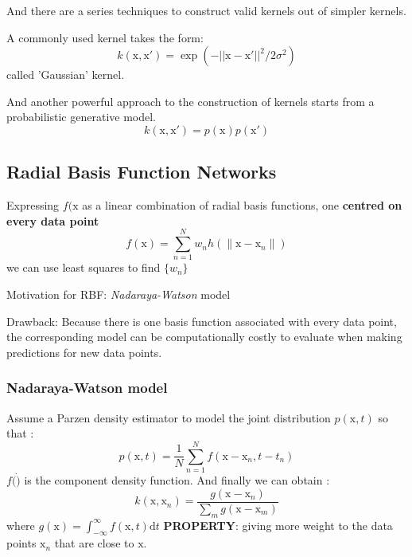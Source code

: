 \documentclass[a4paper]{book}
\begin{document}
And there are a series techniques to construct valid kernels out of simpler kernels.

A commonly used kernel takes the form:
$$k(\mathrm  x,\mathrm  x') = \exp(-||\mathrm  x-\mathrm  x'||^2/2\sigma^2)$$
called 'Gaussian' kernel.

And another powerful approach to the construction of kernels starts from a probabilistic generative model.  $$k(\mathrm  x,\mathrm x') = p(\mathrm  x)p(\mathrm  x')$$
\subsection{Radial Basis Function Networks}
Expressing $f(\mathrm{x}$ as a linear combination of radial basis functions, one \textbf{centred on every data point}
\begin{equation}
  f(\mathrm{x})  = \sum_{n=1}^{N}w_nh(\parallel\mathrm{x}-\mathrm{x}_n\parallel)
\end{equation}
we can use least squares to find $\{w_n\}$

Motivation for RBF:   \textit{Nadaraya-Watson} model

Drawback: Because there is one basis function associated with every data point, the corresponding model can be computationally costly to evaluate when making predictions for new data points.
\subsubsection{ Nadaraya-Watson model}
Assume a Parzen density estimator to model the joint distribution $p(\mathrm x, t) $ so that :
\begin{equation}
p(\mathrm x,t) = \frac1N\sum_{n=1}^{N}f(\mathrm x-\mathrm x_n,t-t_n)
\end{equation}
$f(\dot)$ is the component density function. And finally we can obtain :
\begin{equation}
k(\mathrm x,\mathrm x_n) = \frac{g(\mathrm x-\mathrm x_n)}{\sum_mg(\mathrm x-\mathrm x_m)}
\end{equation}
where $g(\mathrm x) = \int_{-\infty}^{\infty}f(\mathrm x,t)\mathrm dt$
\textbf{PROPERTY}:  giving more weight to the data points $\mathrm x_n$ that are close to $\mathrm x$.
\end{document}
